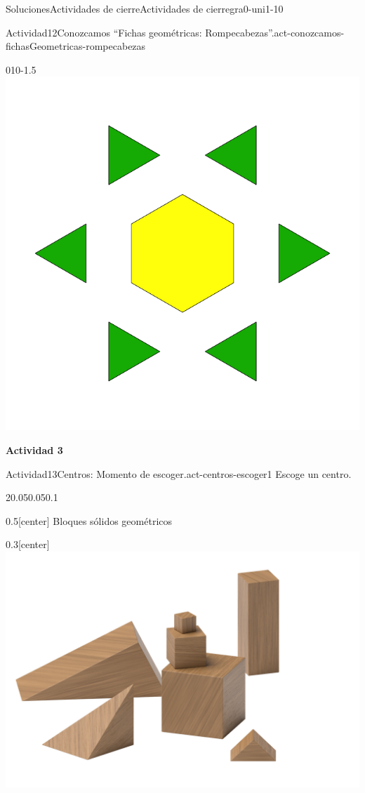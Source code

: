 \documentclass[twoside,10pt,]{article}
\begin{document}
\begin{solutions-section}{Soluciones}{Actividades de cierre}{}{Actividades de cierre}{}{}{gra0-uni1-10}
\begin{activitysolution}{Actividad}{12}{Conozcamos “Fichas geométricas: Rompecabezas”.}{act-conozcamos-fichasGeometricas-rompecabezas}%
\begin{image}{0}{1}{0}{-1.5\baselineskip}%
\includegraphics[width=\linewidth]{external/svg-source/tikz-file-148147.pdf}
\end{image}%
\end{activitysolution}%
\par\medskip
\noindent\textbf{\large{}\space\textperiodcentered\space{}Actividad 3}
\begin{activitysolution}{Actividad}{13}{Centros: Momento de escoger.}{act-centros-escoger1}%
Escoge un centro.%
\begin{sidebyside}{2}{0.05}{0.05}{0.1}%
\begin{sbspanel}{0.5}[center]%
Bloques sólidos geométricos%
\end{sbspanel}%
\begin{sbspanel}{0.3}[center]%
\includegraphics[width=\linewidth]{external/png-source/K.1.A Beta Student Workbook.Geoblocks.png}

\end{sbspanel}
\end{sidebyside}
\end{activitysolution}
\end{solutions-section}
\end{document}
